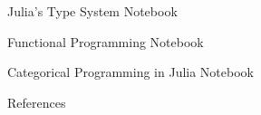 \documentclass[aspectratio=169,xcolor=dvipsnames,10pt]{beamer}
\theoremstyle{definition}
\begin{document}
\begin{frame}[fragile]{Julia's Type System}
    Notebook
\end{frame}

\begin{frame}[fragile]{Functional Programming}
    Notebook
\end{frame}

\begin{frame}[fragile]{Categorical Programming in Julia}
    Notebook
\end{frame}

\begin{frame}{References}
    \footnotesize
    
    
\end{frame}



\end{document}
